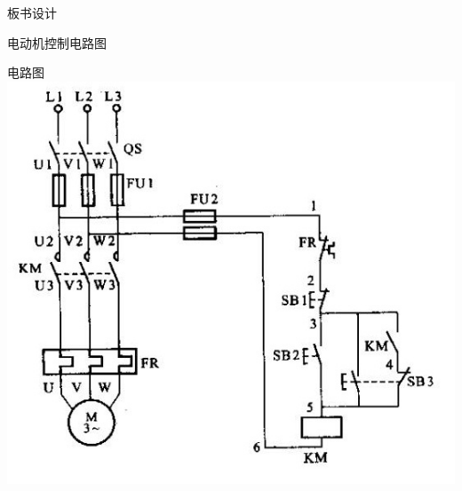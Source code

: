 {\begin{landscape}
\end{landscape}
\clearpage

\begin{center}
{\huge 板书设计}
\end{center}
}

\begin{frame}[containsverbatim]{电动机控制电路图}
	\begin{block}{电路图}
\includegraphics[scale=0.4]{dianxiangdianlu.png}
\end{block}
\end{frame}

